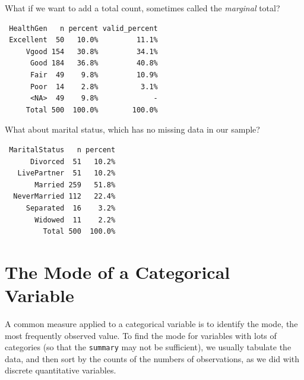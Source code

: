 \documentclass[
]{book}
\newenvironment{Shaded}{\begin{snugshade}}{\end{snugshade}}
\newcommand{\KeywordTok}[1]{\textcolor[rgb]{0.13,0.29,0.53}{\textbf{#1}}}
\newcommand{\NormalTok}[1]{#1}
\newcommand{\OperatorTok}[1]{\textcolor[rgb]{0.81,0.36,0.00}{\textbf{#1}}}
\newcommand{\StringTok}[1]{\textcolor[rgb]{0.31,0.60,0.02}{#1}}
\begin{document}
What if we want to add a total count, sometimes called the \emph{marginal} total?

\begin{Shaded}
\end{Shaded}

\begin{verbatim}
 HealthGen   n percent valid_percent
 Excellent  50   10.0%         11.1%
     Vgood 154   30.8%         34.1%
      Good 184   36.8%         40.8%
      Fair  49    9.8%         10.9%
      Poor  14    2.8%          3.1%
      <NA>  49    9.8%             -
     Total 500  100.0%        100.0%
\end{verbatim}

What about marital status, which has no missing data in our sample?

\begin{Shaded}
\end{Shaded}

\begin{verbatim}
 MaritalStatus   n percent
      Divorced  51   10.2%
   LivePartner  51   10.2%
       Married 259   51.8%
  NeverMarried 112   22.4%
     Separated  16    3.2%
       Widowed  11    2.2%
         Total 500  100.0%
\end{verbatim}

\hypertarget{the-mode-of-a-categorical-variable}{%
\section{The Mode of a Categorical Variable}\label{the-mode-of-a-categorical-variable}}

A common measure applied to a categorical variable is to identify the mode, the most frequently observed value. To find the mode for variables with lots of categories (so that the \texttt{summary} may not be sufficient), we usually tabulate the data, and then sort by the counts of the numbers of observations, as we did with discrete quantitative variables.
\end{document}

